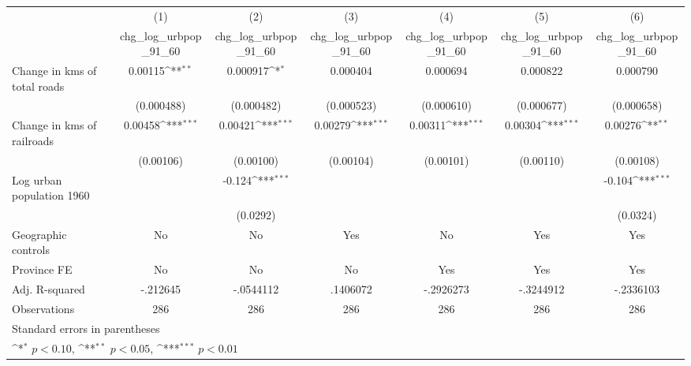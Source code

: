 {
\def\sym#1{\ifmmode^{#1}\else\(^{#1}\)\fi}
\begin{tabular}{l*{6}{c}}
\hline\hline
                    &\multicolumn{1}{c}{(1)}&\multicolumn{1}{c}{(2)}&\multicolumn{1}{c}{(3)}&\multicolumn{1}{c}{(4)}&\multicolumn{1}{c}{(5)}&\multicolumn{1}{c}{(6)}\\
                    &\multicolumn{1}{c}{chg\_log\_urbpop\_91\_60}&\multicolumn{1}{c}{chg\_log\_urbpop\_91\_60}&\multicolumn{1}{c}{chg\_log\_urbpop\_91\_60}&\multicolumn{1}{c}{chg\_log\_urbpop\_91\_60}&\multicolumn{1}{c}{chg\_log\_urbpop\_91\_60}&\multicolumn{1}{c}{chg\_log\_urbpop\_91\_60}\\
\hline
Change in kms of total roads&     0.00115\sym{**} &    0.000917\sym{*}  &    0.000404         &    0.000694         &    0.000822         &    0.000790         \\
                    &  (0.000488)         &  (0.000482)         &  (0.000523)         &  (0.000610)         &  (0.000677)         &  (0.000658)         \\
[1em]
Change in kms of railroads&     0.00458\sym{***}&     0.00421\sym{***}&     0.00279\sym{***}&     0.00311\sym{***}&     0.00304\sym{***}&     0.00276\sym{**} \\
                    &   (0.00106)         &   (0.00100)         &   (0.00104)         &   (0.00101)         &   (0.00110)         &   (0.00108)         \\
[1em]
Log urban population 1960&                     &      -0.124\sym{***}&                     &                     &                     &      -0.104\sym{***}\\
                    &                     &    (0.0292)         &                     &                     &                     &    (0.0324)         \\
\hline
Geographic controls &          No         &          No         &         Yes         &          No         &         Yes         &         Yes         \\
Province FE         &          No         &          No         &          No         &         Yes         &         Yes         &         Yes         \\
Adj. R-squared      &    -.212645         &   -.0544112         &    .1406072         &   -.2926273         &   -.3244912         &   -.2336103         \\
Observations        &         286         &         286         &         286         &         286         &         286         &         286         \\
\hline\hline
\multicolumn{7}{l}{\footnotesize Standard errors in parentheses}\\
\multicolumn{7}{l}{\footnotesize \sym{*} \(p<0.10\), \sym{**} \(p<0.05\), \sym{***} \(p<0.01\)}\\
\end{tabular}
}
